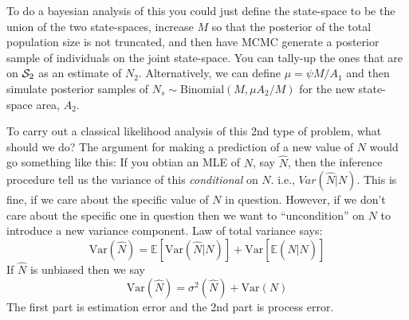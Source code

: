 To do a bayesian analysis of this you could just define the
state-space to be the union of the two state-spaces, increase $M$ so
that the posterior of the total population size is not truncated, and
then have MCMC generate a posterior sample of individuals on the joint
state-space. You can tally-up the ones that are on ${\cal S}_{2}$ as
an estimate of $N_{2}$. Alternatively, we can define $\mu = \psi M/A_{1}$
and then simulate posterior samples of $N_{s} \sim \mbox{Binomial}(M,
\mu A_{2}/M)$ for the new state-space area,  $A_{2}$. 

To carry out a classical likelihood analysis of this 2nd type of
problem, what should we do?
The argument for making a prediction of a new value of $N$
would go something like this: If you obtian an MLE of $N$, say
$\hat{N}$, then the inference procedure tell us the variance of this
{\it conditional} on $N$. i.e., $Var(\hat{N}|N)$. This is fine, if we
care about the specific value of $N$ in question.  However, if we
don't care about the specific one in question then we want to
``uncondition'' on $N$ to introduce a new variance component. Law of
total variance says:
\[
 \mbox{Var}(\hat{N}) = \mathbb{E}[ \mbox{Var}( \hat{N}|N)] +  \mbox{Var}[ \mathbb{E}( \hat{N} |N)]
\]
If $\hat{N}$ is unbiased then we say
\[
 \mbox{Var}(\hat{N}) = \sigma^{2}(\hat{N}) + \mbox{Var}(N)
\]
The first part is estimation error and the 2nd part is process error.


